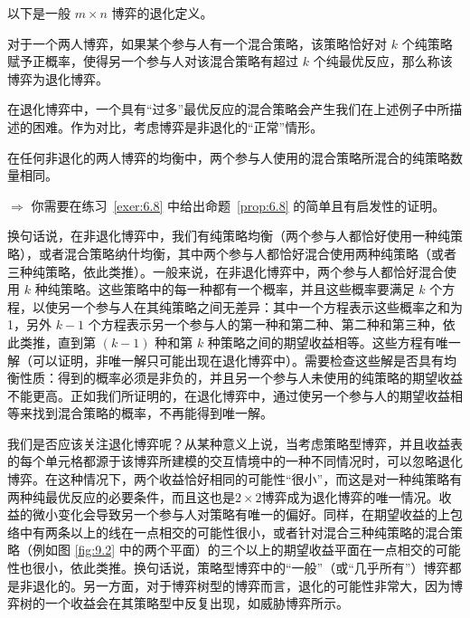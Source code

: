 以下是一般 \(m \times  n\) 博弈的退化定义。

\begin{definition}[退化博弈] \label{def:6.7} %
    对于一个两人博弈，如果某个参与人有一个混合策略，该策略恰好对 \(k\) 个纯策略赋予正概率，使得另一个参与人对该混合策略有超过 \(k\) 个纯最优反应，那么称该博弈为退化博弈。
\end{definition}


在退化博弈中，一个具有“过多”最优反应的混合策略会产生我们在上述例子中所描述的困难。作为对比，考虑博弈是非退化的“正常”情形。

\bigskip
\noindent

\begin{proposition}\label{prop:6.8} %
    在任何非退化的两人博弈的均衡中，两个参与人使用的混合策略所混合的纯策略数量相同。
\end{proposition}


\(\Rightarrow\) 你需要在练习~\ref{exer:6.8} 中给出命题~\ref{prop:6.8} 的简单且有启发性的证明。

换句话说，在非退化博弈中，我们有纯策略均衡（两个参与人都恰好使用一种纯策略），或者混合策略纳什均衡，其中两个参与人都恰好混合使用两种纯策略（或者三种纯策略，依此类推）。一般来说，在非退化博弈中，两个参与人都恰好混合使用 \(k\) 种纯策略。这些策略中的每一种都有一个概率，并且这些概率要满足 \(k\) 个方程，以使另一个参与人在其纯策略之间无差异：其中一个方程表示这些概率之和为 1，另外 \(k - 1\) 个方程表示另一个参与人的第一种和第二种、第二种和第三种，依此类推，直到第 $(k - 1)$ 种和第 \(k\) 种策略之间的期望收益相等。这些方程有唯一解（可以证明，非唯一解只可能出现在退化博弈中）。需要检查这些解是否具有均衡性质：得到的概率必须是非负的，并且另一个参与人未使用的纯策略的期望收益不能更高。正如我们所证明的，在退化博弈中，通过使另一个参与人的期望收益相等来找到混合策略的概率，不再能得到唯一解。

我们是否应该关注退化博弈呢？从某种意义上说，当考虑策略型博弈，并且收益表的每个单元格都源于该博弈所建模的交互情境中的一种不同情况时，可以忽略退化博弈。在这种情况下，两个收益恰好相同的可能性“很小”，而这是对一种纯策略有两种纯最优反应的必要条件，而且这也是$2\times 2$博弈成为退化博弈的唯一情况。收益的微小变化会导致另一个参与人对策略有唯一的偏好。同样，在期望收益的上包络中有两条以上的线在一点相交的可能性很小，或者针对混合三种纯策略的混合策略（例如图 \ref{fig:9.2} 中的两个平面）的三个以上的期望收益平面在一点相交的可能性也很小，依此类推。换句话说，策略型博弈中的“一般”（或“几乎所有”）博弈都是非退化的。另一方面，对于博弈树型的博弈而言，退化的可能性非常大，因为博弈树的一个收益会在其策略型中反复出现，如威胁博弈所示。

